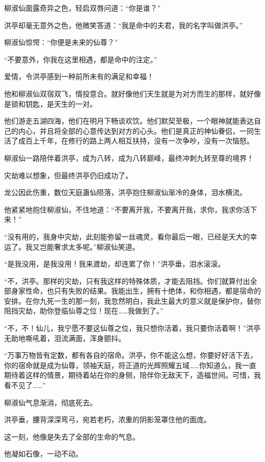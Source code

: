 \begin{this_body}
柳淑仙面露奇异之色，轻启双唇问道：“你是谁？”

洪亭却毫无意外之色，他微笑答道：“我是命中的夫君，我的名字叫做洪亭。”

柳淑仙惊愕：“你便是未来的仙尊？”

“不要意外，你我在这里相遇，都是命中的注定。”

爱情，令洪亭感到一种前所未有的满足和幸福！

他和柳淑仙双宿双飞，情投意合。就好像他们天生就是为对方而生的那样，就好像是锁和钥匙，是天生的一对。

他们游走五湖四海，他们在明月下畅谈欢饮。他们默契至极，一个眼神就能表达自己的内心，并且将全部的心意传达到对方的心头。他们是真正的神仙眷侣，一同生活了成百上千年，在修行的路上两人相互扶持，没有一次争吵，没有一次恼怒。

柳淑仙一路陪伴着洪亭，成为八转，成为八转巅峰，最终冲刺九转至尊的境界！

灾劫难以想象，但最终洪亭仍旧成功了。

龙公因此伤重，数位天庭蛊仙陨落，洪亭抱住柳淑仙渐冷的身体，泪水横流。

他紧紧地抱住柳淑仙，不住地道：“不要离开我，不要离开我，求你，我求你活下来！”

“没有用的，我身中灾劫，此刻能弥留一丝魂灵，看你最后一眼，已经是天大的幸运了。我又岂能奢求太多呢。”柳淑仙笑道。

“是我没用，是我没用！我来渡劫，却连累了你！”洪亭垂，泪水滚滚。

“不，洪亭。那样的灾劫，只有我这样的特殊体质，才能去阻挡。你们就算付出全部身家性命，也只有失败的结果。我能出生，拥有十绝体，和你相遇，都是宿命的安排。在你九死一生的那一刻，我忽然明白，我此生最大的意义就是保护你，替你阻挡灾劫，助你登临仙尊之位！现在……我做到了。”

“不，不！仙儿，我宁愿不要这仙尊之位，我只想你活着，我只要你活着啊！”洪亭无助地嘶吼着，泪流满面，浑身颤抖。

“万事万物皆有定数，都有各自的宿命。洪亭，你不能这么想，你要好好活下去，你的宿命就是成为仙尊，领袖天庭，将正道的光辉照耀五域……你知道么，我一直期待着这样的情景，期待着站在你的身侧，陪伴你无敌天下，造福世间。可惜，我看不见了……”

柳淑仙气息渐消，彻底死去。

洪亭垂，腰背深深弯弓，宛若老朽，浓重的阴影笼罩住他的面庞。

这一刻，他像是失去了全部的生命的气息。

他凝如石像，一动不动。


\end{this_body}
